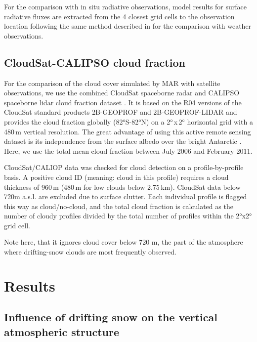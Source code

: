 \documentclass[draft]{agujournal2019}
\begin{document}
For the comparison with in situ radiative observations, model results for surface radiative fluxes are extracted from the 4 closest grid cells to the observation location following the same method described in  for the comparison with weather observations.

\subsection{CloudSat-CALIPSO cloud fraction}
For the comparison of the cloud cover simulated by MAR with satellite observations, we use the combined CloudSat spaceborne radar and CALIPSO spaceborne lidar cloud fraction dataset \cite{kay2009}. It is based on the R04 versions of the CloudSat standard products 2B-GEOPROF \cite{marchand2008} and 2B-GEOPROF-LIDAR \cite{mace2009} and provides the cloud fraction globally (82°S-82°N) on a 2°\,x\,2° horizontal grid with a 480\,m vertical resolution. The great advantage of using this active remote sensing dataset is its independence from the surface albedo over the bright Antarctic \cite{kay2016}. Here, we use the total mean cloud fraction between July 2006 and February 2011. 

CloudSat/CALIOP data was checked for cloud detection on a profile-by-profile basis. A positive cloud ID (meaning: cloud in this profile) requires a cloud thickness of 960\,m (480\,m for low clouds below 2.75\,km). CloudSat data below 720m a.s.l. are excluded due to surface clutter. Each individual profile is flagged this way as cloud/no-cloud, and the total cloud fraction is calculated as the number of cloudy profiles divided by the total number of profiles within the 2°x2° grid cell.

Note here, that it ignores cloud cover below 720 m, the part of the atmosphere where drifting-snow clouds are most frequently observed.

\section{Results}

\subsection{Influence of drifting snow on the vertical atmospheric structure}
\end{document}
